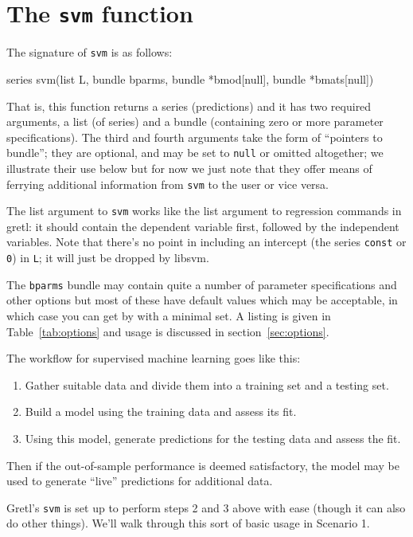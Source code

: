 \documentclass{article}
\begin{document}
\section{The \texttt{svm} function}
\label{sec:function}

The signature of \texttt{svm} is as follows:
\begin{code}
series svm(list L, bundle bparms, bundle *bmod[null], bundle *bmats[null])
\end{code}
That is, this function returns a series (predictions) and it has two
required arguments, a list (of series) and a bundle (containing zero
or more parameter specifications). The third and fourth arguments take
the form of ``pointers to bundle''; they are optional, and may be set
to \texttt{null} or omitted altogether; we illustrate their use below
but for now we just note that they offer means of ferrying additional
information from \texttt{svm} to the user or vice versa.

The list argument to \texttt{svm} works like the list argument to
regression commands in gretl: it should contain the dependent variable
first, followed by the independent variables. Note that there's no
point in including an intercept (the series \texttt{const} or
\texttt{0}) in \texttt{L}; it will just be dropped by \textsf{libsvm}.

The \texttt{bparms} bundle may contain quite a number of parameter
specifications and other options but most of these have default
values which may be acceptable, in which case you can get by with a
minimal set.  A listing is given in Table~\ref{tab:options} and usage
is discussed in section~\ref{sec:options}.

The workflow for supervised machine learning goes like this:
\begin{enumerate}
\item Gather suitable data and divide them into a training set and a
  testing set.
\item Build a model using the training data and assess its fit.
\item Using this model, generate predictions for the testing data and
  assess the fit.
\end{enumerate}

Then if the out-of-sample performance is deemed satisfactory, the
model may be used to generate ``live'' predictions for additional
data.

Gretl's \texttt{svm} is set up to perform steps 2 and 3 above with
ease (though it can also do other things). We'll walk through this
sort of basic usage in Scenario 1.
\end{document}

